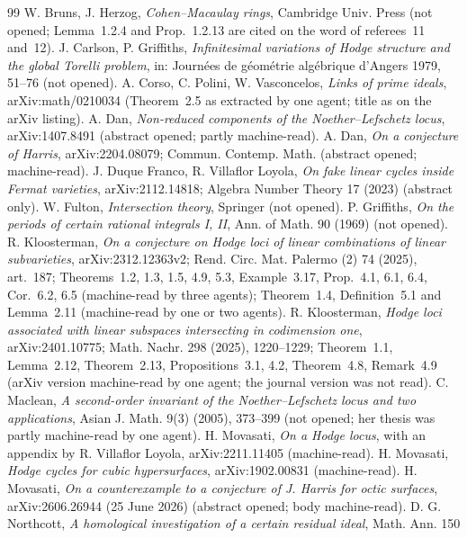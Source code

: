 \documentclass[11pt]{article}
\numberwithin{equation}{section}
\theoremstyle{remark}
\begin{document}
\begin{thebibliography}{99}\small
{} W. Bruns, J. Herzog, \emph{Cohen--Macaulay rings}, Cambridge Univ. Press (not opened; Lemma~1.2.4 and
Prop.~1.2.13 are cited on the word of referees~11 and~12).
 J. Carlson, P. Griffiths, \emph{Infinitesimal variations of Hodge structure and the global Torelli
problem}, in: Journ\'ees de g\'eom\'etrie alg\'ebrique d'Angers 1979, 51--76 (not opened).
 A. Corso, C. Polini, W. Vasconcelos, \emph{Links of prime ideals}, arXiv:math/0210034 (Theorem~2.5
as extracted by one agent; title as on the arXiv listing).
 A. Dan, \emph{Non-reduced components of the Noether--Lefschetz locus}, arXiv:1407.8491 (abstract
opened; partly machine-read).
 A. Dan, \emph{On a conjecture of Harris}, arXiv:2204.08079; Commun. Contemp. Math. (abstract
opened; machine-read).
 J. Duque Franco, R. Villaflor Loyola, \emph{On fake linear cycles inside Fermat varieties},
arXiv:2112.14818; Algebra Number Theory 17 (2023) (abstract only).
 W. Fulton, \emph{Intersection theory}, Springer (not opened).
 P. Griffiths, \emph{On the periods of certain rational integrals I, II}, Ann. of Math. 90 (1969)
(not opened).
 R. Kloosterman, \emph{On a conjecture on Hodge loci of linear combinations of linear subvarieties},
arXiv:2312.12363v2; Rend. Circ. Mat. Palermo (2) 74 (2025), art.~187; Theorems~1.2, 1.3, 1.5, 4.9, 5.3,
Example~3.17, Prop.~4.1, 6.1, 6.4, Cor.~6.2, 6.5 (machine-read by three agents); Theorem~1.4, Definition~5.1 and
Lemma~2.11 (machine-read by one or two agents).
 R. Kloosterman, \emph{Hodge loci associated with linear subspaces intersecting in codimension
one}, arXiv:2401.10775; Math. Nachr. 298 (2025), 1220--1229; Theorem~1.1, Lemma~2.12, Theorem~2.13,
Propositions~3.1, 4.2, Theorem~4.8, Remark~4.9 (arXiv version machine-read by one agent; the journal version
was not read).
 C. Maclean, \emph{A second-order invariant of the Noether--Lefschetz locus and two applications},
Asian J. Math. 9(3) (2005), 373--399 (not opened; her thesis was partly machine-read by one agent).
 H. Movasati, \emph{On a Hodge locus}, with an appendix by R. Villaflor Loyola, arXiv:2211.11405
(machine-read).
 H. Movasati, \emph{Hodge cycles for cubic hypersurfaces}, arXiv:1902.00831 (machine-read).
 H. Movasati, \emph{On a counterexample to a conjecture of J. Harris for octic surfaces},
arXiv:2606.26944 (25 June 2026) (abstract opened; body machine-read).
 D. G. Northcott, \emph{A homological investigation of a certain residual ideal}, Math. Ann. 150

\end{thebibliography}
\end{document}
